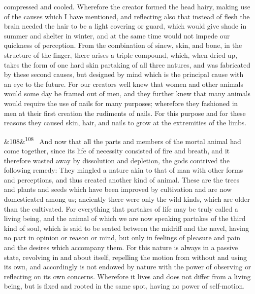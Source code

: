 \documentclass[12pt]{article}
\newcommand{\para}[1][]{\par\noindent\ifx&#1&\else\textsuperscript{\footnotesize #1}~\fi}
\begin{document}
compressed and cooled. Wherefore the creator formed the head hairy, making use of the causes which I have mentioned, and reflecting also that instead of flesh the brain needed the hair to be a light covering or guard, which would give shade in summer and shelter in winter, and at the same time would not impede our quickness of perception. From the combination of sinew, skin, and bone, in the structure of the finger, there arises a triple compound, which, when dried up, takes the form of one hard skin partaking of all three natures, and was fabricated by these second causes, but designed by mind which is the principal cause with an eye to the future. For our creators well knew that women and other animals would some day be framed out of men, and they further knew that many animals would require the use of nails for many purposes; wherefore they fashioned in men at their first creation the rudiments of nails. For this purpose and for these reasons they caused skin, hair, and nails to grow at the extremities of the limbs.

\para[108] And now that all the parts and members of the mortal animal had come together, since its life of necessity consisted of fire and breath, and it therefore wasted away by dissolution and depletion, the gods contrived the following remedy: They mingled a nature akin to that of man with other forms and perceptions, and thus created another kind of animal. These are the trees and plants and seeds which have been improved by cultivation and are now domesticated among us; anciently there were only the wild kinds, which are older than the cultivated. For everything that partakes of life may be truly called a living being, and the animal of which we are now speaking partakes of the third kind of soul, which is said to be seated between the midriff and the navel, having no part in opinion or reason or mind, but only in feelings of pleasure and pain and the desires which accompany them. For this nature is always in a passive state, revolving in and about itself, repelling the motion from without and using its own, and accordingly is not endowed by nature with the power of observing or reflecting on its own concerns. Wherefore it lives and does not differ from a living being, but is fixed and rooted in the same spot, having no power of self-motion.
\end{document}
